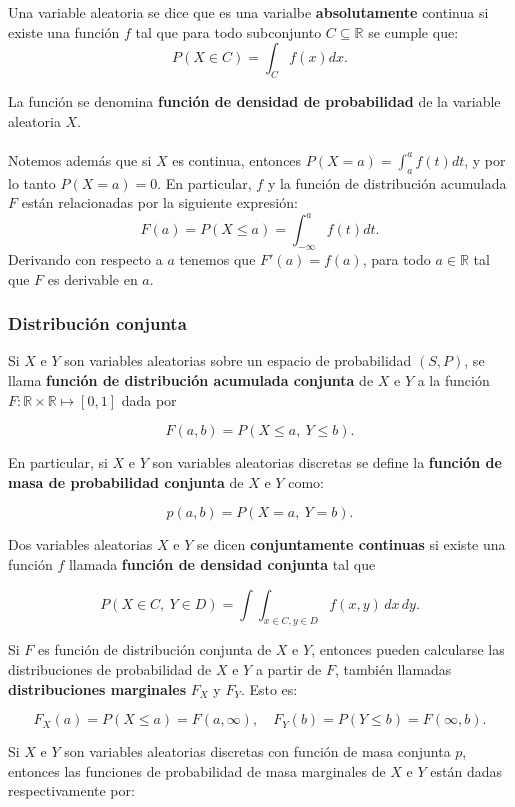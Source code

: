\documentclass[11pt, a4paper]{article}
\theoremstyle{definition}
\begin{document}
Una variable aleatoria se dice que es una varialbe \textbf{absolutamente} continua si existe una función $f$ tal que para todo subconjunto 
$C \subseteq \mathbb{R}$ se cumple que:
\[
P(X \in C) = \int_C f(x) dx.
\]

La función se denomina \textbf{función de densidad de probabilidad} de la variable aleatoria $X$.
\\ \\
Notemos además que si $X$ es continua, entonces $P(X = a) = \int_a^a f(t) dt$, y por lo tanto $P(X=a)=0$.
En particular, $f$ y la función de distribución acumulada $F$ están relacionadas por la siguiente expresión:
\[
F(a)=P(X \leq a) = \int_{-\infty}^a f(t) dt.
\]
Derivando con respecto a $a$ tenemos que $F'(a) = f(a)$, para todo $a \in \mathbb{R}$ tal que $F$ es derivable en $a$.

\subsubsection{Distribución conjunta}

Si \(X\) e \(Y\) son variables aleatorias sobre un espacio de probabilidad \((S,P)\), se llama \textbf{función de distribución acumulada conjunta} de \(X\) e \(Y\) a la función \(F:\mathbb{R}\times\mathbb{R}\mapsto[0,1]\) dada por

\[F(a,b)=P(X\leq a,\ Y\leq b).\]

En particular, si \(X\) e \(Y\) son variables aleatorias discretas se define la \textbf{función de masa de probabilidad conjunta} de \(X\) e \(Y\) como:

\[p(a,b)=P(X=a,\ Y=b).\]

Dos variables aleatorias \(X\) e \(Y\) se dicen \textbf{conjuntamente continuas} si existe una función \(f\) llamada \textbf{función de densidad conjunta} tal que

\[P(X\in C,\ Y\in D)=\int\int_{x\in C,y\in D}f(x,y)\,dx\,dy.\]

Si \(F\) es función de distribución conjunta de \(X\) e \(Y\), entonces pueden calcularse las distribuciones de probabilidad de \(X\) e \(Y\) a partir de \(F\), también llamadas \textbf{distribuciones marginales} \(F_{X}\) y \(F_{Y}\). Esto es:

\[F_{X}(a)=P(X\leq a)=F(a,\infty), \quad F_{Y}(b)=P(Y\leq b)=F(\infty,b).\]

Si \(X\) e \(Y\) son variables aleatorias discretas con función de masa conjunta \(p\), entonces las funciones de probabilidad de masa marginales de \(X\) e \(Y\) están dadas respectivamente por:
\end{document}
